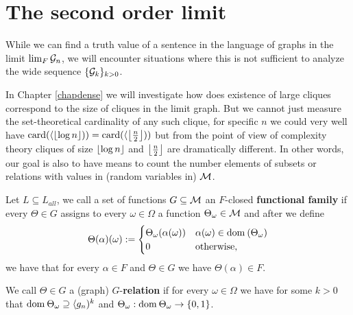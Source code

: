 \section{The second order limit}

While we can find a truth value of a sentence in the language of graphs in the limit $\lim_{F}\mathcal{G}_n$, we will encounter situations where this is not sufficient to analyze the wide sequence $\{\mathcal{G}_k\}_{k>0}$. 

In Chapter \ref{chapdense} we will investigate how does existence of large cliques correspond to the size of cliques in the limit graph. But we cannot just measure the set-theoretical cardinality of any such clique, for specific $n$ we could very well have $\text{card}(\langle \left \lfloor {\log{n}} \right \rfloor))=\text{card}(\langle \left \lfloor {\frac{n}{2}} \right \rfloor))$ but from the point of view of complexity theory cliques of size $\left \lfloor {\log n} \right \rfloor$ and $\left \lfloor {\frac{n}{2}} \right \rfloor$ are dramatically different. In other words, our goal is also to have means to count the number elements of subsets or relations with values in (random variables in) $\mathcal{M}$.

\begin{defi}
Let $L\subseteq L_{all}$, we call a set of functions $G\subseteq \mathcal{M}$ an $F$-closed \textbf{functional family} if every $\Theta\in G$ assigns to every $\omega\in\Omega$ a function $\Theta_\omega\in\mathcal{M}$ and after we define
\[\Theta(\alpha)(\omega):=
\begin{cases}\Theta_\omega(\alpha(\omega))&\alpha(\omega)\in\text{dom}\:(\Theta_\omega)\\0&\text{otherwise,}
\end{cases}\]
we have that for every $\alpha \in F$ and $\Theta \in G$ we have $\Theta(\alpha)\in F$.

We call $\Theta\in G$ a (graph) $G$-\textbf{relation} if for every $\omega\in\Omega$ we have for some $k>0$ that $\text{dom}\: \Theta_\omega \supseteq \langle g_n)^k$ and $\Theta_\omega:\text{dom}\: \Theta_\omega \to \{0,1\}$.
\end{defi}

